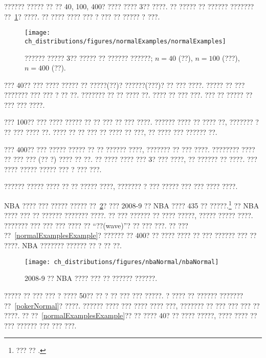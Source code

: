 \textC{\newpage}

\begin{example}{?????? ????? ?? ?? 40, 100, 400? ???? ???? 3?? ????. ?? ????? ?? ?????? ??????? ??~\ref{normalExamples}? ????. ?? ???? ???? ??? ? ??? ?? ????? ? ???.} \label{normalExamplesExample}

\begin{figure}
\centering
\texttt{[image: ch\_distributions/figures/normalExamples/normalExamples]}
\caption{?????? ????? 3?? ????? ?? ?????? ??????; $n=40$ (??), $n=100$ (???), $n=400$ (??).}
\label{normalExamples}
\end{figure}

??? 40?? ??? ???? ????? ?? ?????(??)? ??????(???)? ?? ??? ????. ????? ?? ??? ??????? ??? ??? ? ?? ??. ??????? ?? ?? ???? ??. ???? ?? ??? ???. ??? ?? ????? ?? ??? ??? ????.

??? 100?? ??? ???? ????? ?? ?? ??? ?? ??? ????. ?????? ???? ?? ???? ??, ??????? ? ?? ??? ???? ??. ???? ?? ?? ??? ?? ???? ?? ???, ?? ???? ??? ?????? ??. 

??? 400?? ??? ????? ????? ?? ?? ?????? ????, ??????? ?? ??? ????. ???????? ???? ?? ??? ??? (?? ?) ???? ?? ??. ?? ???? ???? ??? 3? ??? ????, ?? ?????? ?? ????. ??? ???? ????? ????? ??? ? ??? ???.

?????? ????? ???? ?? ?? ????? ????, ??????? ? ??? ????? ??? ??? ???? ????.

\end{example}

\textC{\pagebreak}

\begin{example}{NBA ???? ??? ????? ????? ??~\ref{nbaNormal}? ??? 2008-9 ?? NBA ???? 435 ?? ?????.\footnote{??? ?? .}}
?? NBA ???? ??? ?? ?????? ??????? ????. ?? ??? ?????? ?? ???? ?????, ????? ????? ????. ??????? ??? ??? ??? ???? ?? ``??(wave)''? ?? ??? ???. ?? ??? ??~\ref{normalExamplesExample}? ?????? ?? 400? ?? ???? ???? ?? ??? ?????? ??? ?? ????. NBA ??????? ?????? ?? ? ?? ??.
\end{example}

\begin{figure}
\centering
\texttt{[image: ch\_distributions/figures/nbaNormal/nbaNormal]}
\caption{2008-9 ?? NBA ???? ??? ?? ?????? ??????.}
\label{nbaNormal}
\end{figure}

\begin{example}{
????? ?? ??? ??? ? ???? 50?? ?? ? ?? ??? ??? ?????. ? ???? ?? ?????? ??????? ??~\ref{pokerNormal}? ????.}
?????? ???? ??? ???? ???? ???, ??????? ?? ??? ??? ??? ?? ????. ?? ??~\ref{normalExamplesExample}?? ?? ???? 40? ?? ???? ?????, ???? ???? ?? ??? ?????? ??? ??? ???.
\end{example}

